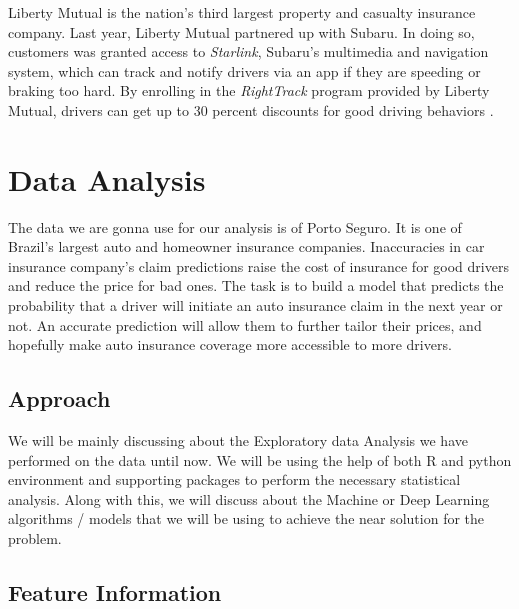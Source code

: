 Liberty Mutual is the nation's third largest property and casualty insurance company. Last year, Liberty Mutual partnered up with Subaru. In doing so, customers was granted access to {\em Starlink}, Subaru's multimedia and navigation system, which can track and notify drivers via an app if they are speeding or braking too hard. By enrolling in the {\em RightTrack} program provided by Liberty Mutual, drivers can get up to 30 percent discounts for good driving behaviors \cite{Fung2016turn}. 

\section{Data Analysis}
The data we are gonna use for our analysis is of Porto Seguro. It is one of Brazil's largest auto and homeowner insurance companies. Inaccuracies in car insurance company's claim predictions raise the cost of insurance for good drivers and reduce the price for bad ones. The task is to build a model that predicts the probability that a driver will initiate an auto insurance claim in the next year or not. An accurate prediction will allow them to further tailor their prices, and hopefully make auto insurance coverage more accessible to more drivers. 
\\
\subsection{Approach}
We will be mainly discussing about the Exploratory data Analysis we have  performed on the data until now. We will be using the help of both R and python environment and supporting packages to perform the necessary statistical analysis. Along with this, we will discuss  about  the  Machine  or  Deep  Learning  algorithms  / models that we will be using to achieve the near solution for the problem.

\subsection{Feature Information}

